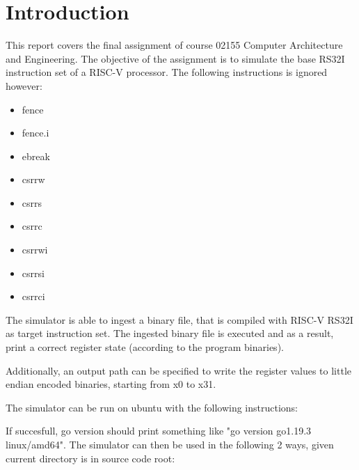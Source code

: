 \section*{Introduction}

This report covers the final assignment of course 02155 Computer Architecture and Engineering.
The objective of the assignment is to simulate the base RS32I instruction set of a RISC-V processor.
The following instructions is ignored however:
\begin{itemize}
    \item fence
    \item fence.i
    \item ebreak
    \item csrrw
    \item csrrs
    \item csrrc
    \item csrrwi
    \item csrrsi
    \item csrrci
\end{itemize}

The simulator is able to ingest a binary file, that is compiled with RISC-V RS32I as target instruction set.
The ingested binary file is executed and as a result, print a correct register state (according to the program binaries).

Additionally, an output path can be specified to write the register values to little endian encoded binaries, starting from x0 to x31.

The simulator can be run on ubuntu with the following instructions:

\begin{figure}[H]
\end{figure}
If succesfull, go version should print something like "go version go1.19.3 linux/amd64".
The simulator can then be used in the following 2 ways, given current directory is in source code root:

\begin{figure}[H]
\end{figure}

\begin{figure}[H]
\end{figure}